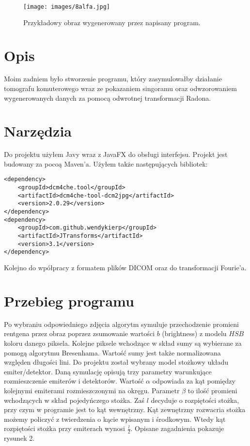 \documentclass{article}
\begin{document}



\begin{figure}
\begin{center}
\texttt{[image: images/8alfa.jpg]}
\end{center}
\caption{Przykładowy obraz wygenerowany przez napisany program.}
\end{figure}

\section{Opis}

\indent Moim zadniem było stworzenie programu, który zasymulowałby działanie tomografu komuterowego wraz ze pokazaniem singoramu oraz odwzorowaniem wygenerowanych danych za pomocą odwrotnej transformacji Radona. 

\section{Narzędzia}

\indent Do projektu użyłem Javy wraz z JavaFX do obsługi interfejsu. Projekt jest budowany za pocoą Maven'a. Użyłem także następujących bibliotek:

\begin{lstlisting}[frame=single]  
 <dependency>
	<groupId>dcm4che.tool</groupId>
	<artifactId>dcm4che-tool-dcm2jpg</artifactId>
	<version>2.0.29</version>
</dependency>
<dependency>
	<groupId>com.github.wendykierp</groupId>
	<artifactId>JTransforms</artifactId>
	<version>3.1</version>
</dependency>
\end{lstlisting}
Kolejno do wpółpracy z formatem plików DICOM oraz do transformacji Fourie'a.

\section{Przebieg programu}
Po wybraniu odpowiedniego zdjęcia algorytm symuluje przechodzenie promieni rentgena przez obraz poprzez zsumowanie wartości $b$ (brightness) z modelu $HSB$ koloru danego piksela. Kolejne piksele wchodzące w skład sumy są wybierane za pomogą algorytmu Bresenhama. Wartość sumy jest także normalizowana względen długości lini. Do projektu został wybrany model stożkowy układu emiter/detektor. Daną symulację opisują trzy parametry warunkujące rozmieszczenie emiterów i detektorów. Wartość $\alpha$ odpowiada za kąt pomiędzy kolejnymi emiterami rozmieszczonymi na okręgu. Parametr $\beta$ to ilość promieni wchodzących w skład pojedyńczego stożka. Zaś $l$ decyduje o rozpiętości stożka, przy czym w programie jest to kąt wewnętrzny. Kąt zewnętrzny rozwacria stożka możemy policzyć z twierdzenia o kącie wpisanym i środkowym. Wtedy kąt rozpiętości stożka przy emiterach wynosi $\frac{l}{2}$. Opisane zagadnienia pokazuje rysunek 2.
\end{document}
